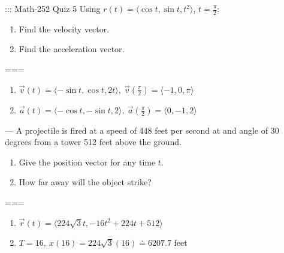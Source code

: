 ::: Math-252 Quiz 5
Using \(r(t)=\langle\cos t,\sin t,t^2\rangle\), \(t=\frac{\pi}{2}\):
\begin{enumerate}[label=\alph*.]
  \item Find the velocity vector.
  \item Find the acceleration vector.
\end{enumerate}
===
\begin{enumerate}[label=\alph*.]
  \item \(\vec v(t)=\langle-\sin t,\cos t,2t\rangle,\
    \vec v(\frac{\pi}{2})=\langle-1,0,\pi\rangle\)
  \item \(\vec a(t)=\langle-\cos t,-\sin t,2\rangle,\
    \vec a(\frac{\pi}{2})=\langle0,-1,2\rangle\)
\end{enumerate}
---
A projectile is fired at a speed of 448 feet per second at and angle of 30
degrees from a tower 512 feet above the ground.
\begin{enumerate}[label=\alph*.]
  \item Give the position vector for any time \(t\).
  \item How far away will the object strike?
\end{enumerate}
===
\begin{enumerate}[label=\alph*.]
  \item \(\vec r(t)=\langle 224\sqrt{3}t,-16t^2+224t+512\rangle\)
  \item \(T=16,\ x(16)=224\sqrt{3}(16)\doteq 6207.7\) feet
\end{enumerate}

